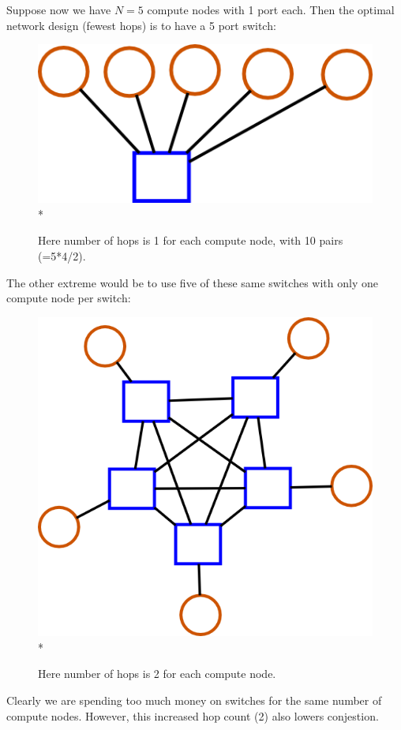 \documentclass[pdftex]{article}
\begin{document}
Suppose now we have $N=5$ compute nodes with 1 port each. Then the optimal network design (fewest hops) is to have a 5 port switch:
\begin{figure}[h!]
\begin{center}
\includegraphics[scale=0.2]{pictures/N5_n1_M1_m5.png}\\*
\caption{Here number of hops is 1 for each compute node, with 10 pairs (=5*4/2).}
\end{center}
\end{figure}

The other extreme would be to use five of these same switches with only one compute node per switch:
\begin{figure}[h!]
\begin{center}
\includegraphics[scale=0.2]{pictures/N5_n1_M5_m5.png}\\*
\caption{Here number of hops is 2 for each compute node.}
\end{center}
\end{figure}
Clearly we are spending too much money on switches for the same number of compute nodes. However, this increased hop count (2) also lowers conjestion.
\end{document}
